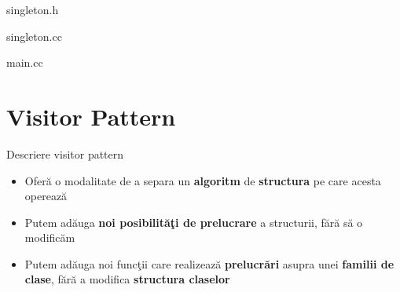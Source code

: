 \documentclass{beamer}
\begin{document}
\begin{frame}{singleton.h}
	\footnotesize{}
\end{frame}

\begin{frame}{singleton.cc}
	\footnotesize{}
\end{frame}

\begin{frame}{main.cc}
	\footnotesize{}
\end{frame}


\section{Visitor Pattern}

\begin{frame}{Descriere visitor pattern}
	\begin{itemize}
		\item Oferă o modalitate de a separa un \textbf{algoritm} de \textbf{structura} pe care acesta operează
		\vspace{4mm}
		\item Putem adăuga \textbf{noi posibilităţi de prelucrare} a structurii, fără să o modificăm
		\vspace{4mm}
		\item Putem adăuga noi funcţii care realizează \textbf{prelucrări} asupra unei \textbf{familii de clase}, fără a modifica \textbf{structura claselor}
	\end{itemize}
\end{frame}
\end{document}
